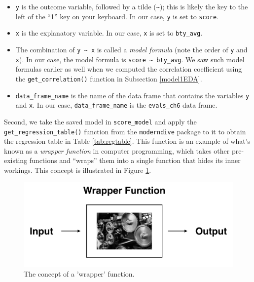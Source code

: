 \documentclass[12pt, krantz2,]{krantz}
\providecommand{\tightlist}{%
  \setlength{\itemsep}{0pt}\setlength{\parskip}{0pt}}
\begin{document}
\begin{itemize}
\tightlist
\item
  \texttt{y} is the outcome variable, followed by a tilde (\texttt{\textasciitilde{}}); this is likely the key to the left of the ``1'' key on your keyboard. In our case, \texttt{y} is set to \texttt{score}.
\item
  \texttt{x} is the explanatory variable. In our case, \texttt{x} is set to \texttt{bty\_avg}.
\item
  The combination of \texttt{y\ \textasciitilde{}\ x} is called a \emph{model formula} (note the order of \texttt{y} and \texttt{x}). In our case, the model formula is \texttt{score\ \textasciitilde{}\ bty\_avg}. We saw such model formulas earlier as well when we computed the correlation coefficient using the \texttt{get\_correlation()} function in Subsection \ref{model1EDA}.
\item
  \texttt{data\_frame\_name} is the name of the data frame that contains the variables \texttt{y} and \texttt{x}. In our case, \texttt{data\_frame\_name} is the \texttt{evals\_ch6} data frame.
\end{itemize}

Second, we take the saved model in \texttt{score\_model} and apply the \texttt{get\_regression\_table()} function from the \texttt{moderndive} package to it to obtain the regression table in Table \ref{tab:regtable}. This function is an example of what's known as a \emph{wrapper function} in computer programming, which takes other pre-existing functions and ``wraps'' them into a single function that hides its inner workings. This concept is illustrated in Figure \ref{fig:moderndive-figure-wrapper}.

\begin{figure}

{\centering \includegraphics[width=\textwidth]{images/flowcharts/flowchart.011-cropped} 

}

\caption{The concept of a 'wrapper' function.}\label{fig:moderndive-figure-wrapper}
\end{figure}
\end{document}
